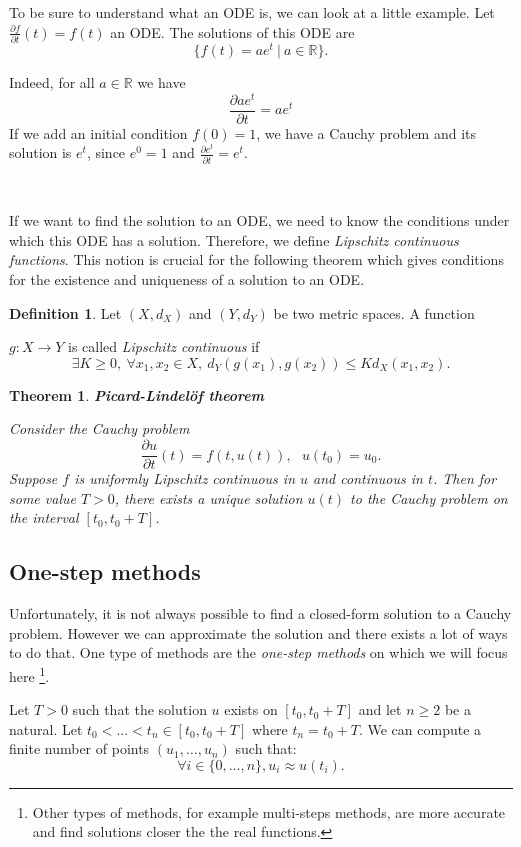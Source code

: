 \documentclass[10pt,a4paper]{article}
\theoremstyle{definition}
\newtheorem{definition}{Definition}
\theoremstyle{plain}
\newtheorem{theorem}{Theorem}
\begin{document}
To be sure to understand what an ODE is, we can look at a little example.
Let $\frac{\partial f}{\partial t}(t) = f(t)$ an ODE. The solutions of this ODE are
$$
\{ f(t) = ae^t\ |\ a\in \mathbb{R}\}.
$$

Indeed, for all $a \in \mathbb{R}$ we have
$$
\frac{\partial ae^t}{\partial t} = ae^t
$$
If we add an initial condition $f(0) = 1$, we have a Cauchy problem and its solution is $e^t$, since $e^0 = 1$ and $\frac{\partial e^t}{\partial t} = e^t$.

~

If we want to find the solution to an ODE, we need to know the conditions under which this ODE has a solution. Therefore, we define \textit{Lipschitz continuous functions}. This notion is crucial for the following theorem which gives conditions for the existence and uniqueness of a solution to an ODE.

\begin{definition}
Let $(X, d_X)$ and $(Y, d_Y)$ be two metric spaces.  
A function 

\noindent $g: X \rightarrow  Y$ is called \textit{Lipschitz continuous} if
$$
\exists K \geq 0, \  \forall x_1, x_2 \in X, \  d_Y(g(x_1), g(x_2)) \leq Kd_X(x_1, x_2).
$$
\end{definition}

\begin{theorem}{\textbf{Picard-Lindelöf theorem}}\label{exiunique}

Consider the Cauchy problem
$$
\frac{\partial u}{\partial t} (t) = f(t, u(t)), \ \ \ u(t_0) = u_0.
$$
Suppose $f$ is uniformly Lipschitz continuous in $u$ and continuous in $t$. Then for some value $T > 0$, there exists a unique solution $u(t)$ to the Cauchy problem on the interval $[t_0, t_0 + T]$. 
\end{theorem}

\subsection{One-step methods}
Unfortunately, it is not always possible to find a closed-form solution to a Cauchy problem.
However we can approximate the solution and there exists a lot of ways to do that. One type of methods are the \textit{one-step methods} on which we will focus here \footnote{Other types of methods, for example multi-steps methods, are more accurate and find solutions closer the the real functions.}.

Let $T > 0$ such that the solution $u$ exists on $[t_0, t_0 + T]$ and let $n \geqslant 2$ be a natural. Let  $t_0 < ... < t_n \in [t_0, t_0 + T]$ where $t_n = t_0 + T$. We can compute a finite number of points $(u_1, \dots, u_n)$ such that:
$$
\forall i\in \{0,\dots, n\},  u_i \approx u(t_i).
$$
\end{document}
